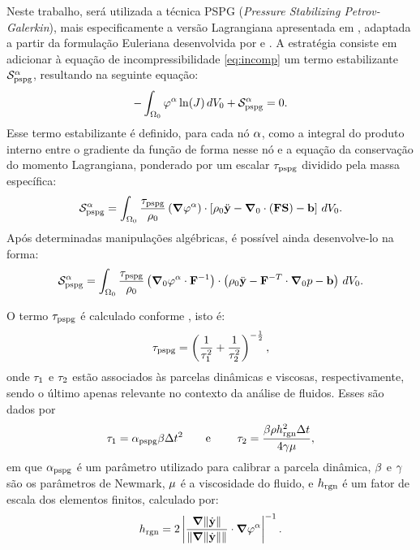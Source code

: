 \documentclass[Tese.tex]{subfiles}
\begin{document}
Neste trabalho, será utilizada a técnica PSPG (\emph{Pressure Stabilizing Petrov-Galerkin}), mais especificamente a versão Lagrangiana apresentada em , adaptada a partir da formulação Euleriana desenvolvida por  e . A estratégia consiste em adicionar à equação de incompressibilidade \eqref{eq:incomp} um termo estabilizante $\mathcal{S}_\text{pspg}^\alpha$, resultando na seguinte equação:
\begin{equation}\label{eq:incomp-new}
-\int_{\Omega_0}\varphi^\alpha\ln(J)\,dV_0 + \mathcal{S}_\text{pspg}^\alpha = 0.
\end{equation}
Esse termo estabilizante é definido, para cada nó $\alpha$, como a integral do produto interno entre o gradiente da função de forma nesse nó e a equação da conservação do momento Lagrangiana, ponderado por um escalar $\tau_\text{pspg}$ dividido pela massa específica:
\begin{equation}
\mathcal{S}_\text{pspg}^\alpha = \int_{\Omega_0}\dfrac{\tau_\text{pspg}}{\rho_0}\left(\boldsymbol{\nabla}\varphi^\alpha\right)\cdot\left[\rho_0\ddot{\mathbf{y}}-\boldsymbol{\nabla}_0\cdot(\mathbf{F}\mathbf{S})-\mathbf{b}\right]\,dV_0.
\end{equation}
Após determinadas manipulações algébricas, é possível ainda desenvolve-lo na forma:
\begin{equation}\label{eq:estabilizacao}
\mathcal{S}_\text{pspg}^\alpha = \int_{\Omega_0}\dfrac{\tau_\text{pspg}}{\rho_0}\left(\boldsymbol{\nabla}_0\varphi^\alpha\cdot\mathbf{F}^{-1}\right)\cdot\left(\rho_0\ddot{\mathbf{y}}-\mathbf{F}^{-T}\cdot\boldsymbol{\nabla}_0p-\mathbf{b}\right)\,dV_0.
\end{equation}

O termo $\tau_\text{pspg}$ é calculado conforme , isto é:
\begin{equation}
\tau_\text{pspg} = \left(\dfrac{1}{\tau_1^2} + \dfrac{1}{\tau_2^2}\right)^{-\frac{1}{2}},
\end{equation}
onde $\tau_1$ e $\tau_2$ estão associados às parcelas dinâmicas e viscosas, respectivamente, sendo o último apenas relevante no contexto da análise de fluidos. Esses são dados por
\begin{equation}\label{eq:tpspg}
\tau_1 = \alpha_\text{pspg}\beta\Delta t^2 \text{\qquad e \qquad} \tau_2 = \dfrac{\beta\rho h_\text{rgn}^2\Delta t}{4\gamma\mu},
\end{equation}
em que $\alpha_\text{pspg}$ é um parâmetro utilizado para calibrar a parcela dinâmica, $\beta$ e $\gamma$ são os parâmetros de Newmark, $\mu$ é a viscosidade do fluido, e $h_\text{rgn}$ é um fator de escala dos elementos finitos, calculado por:
\begin{equation}
h_\text{rgn} = 2\left|\dfrac{\boldsymbol{\nabla}\|\dot{\mathbf{y}}\|}{\left\|\boldsymbol{\nabla}\|\dot{\mathbf{y}}\|\right\|}\cdot\boldsymbol{\nabla}\varphi^\alpha\right|^{-1}.
\end{equation}
\end{document}
